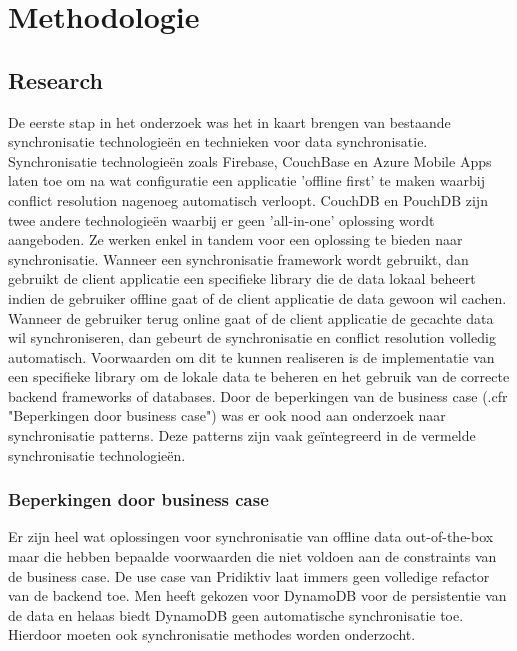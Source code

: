 
\chapter{Methodologie}
\label{ch:methodologie}


\section{Research}
De eerste stap in het onderzoek was het in kaart brengen van bestaande synchronisatie technologie\"en en technieken voor data synchronisatie. Synchronisatie technologie\"en zoals Firebase, CouchBase en Azure Mobile Apps laten toe om na wat configuratie een applicatie 'offline first' te maken waarbij conflict resolution nagenoeg automatisch verloopt. CouchDB en PouchDB zijn twee andere technologie\"en waarbij er geen 'all-in-one' oplossing wordt aangeboden. Ze werken enkel in tandem voor een oplossing te bieden naar synchronisatie. Wanneer een synchronisatie framework wordt gebruikt, dan gebruikt de client applicatie een specifieke library die de data lokaal beheert indien de gebruiker offline gaat of de client applicatie de data gewoon wil cachen. Wanneer de gebruiker terug online gaat of de client applicatie de gecachte data wil synchroniseren, dan gebeurt de synchronisatie en conflict resolution volledig automatisch. Voorwaarden om dit te kunnen realiseren is de implementatie van een specifieke library om de lokale data te beheren en het gebruik van de correcte backend frameworks of databases.
Door de beperkingen van de business case (.cfr "Beperkingen door business case") was er ook nood aan onderzoek naar synchronisatie patterns. Deze patterns zijn vaak ge\"integreerd in de vermelde synchronisatie technologie\"en.
\subsection{Beperkingen door business case}
Er zijn heel wat oplossingen voor synchronisatie van offline data out-of-the-box maar die hebben bepaalde voorwaarden die niet voldoen aan de constraints van de business case. De use case van Pridiktiv laat immers geen volledige refactor van de backend toe. Men heeft gekozen voor DynamoDB voor de persistentie van de data en helaas biedt DynamoDB geen automatische synchronisatie toe. Hierdoor moeten ook synchronisatie methodes worden onderzocht.
